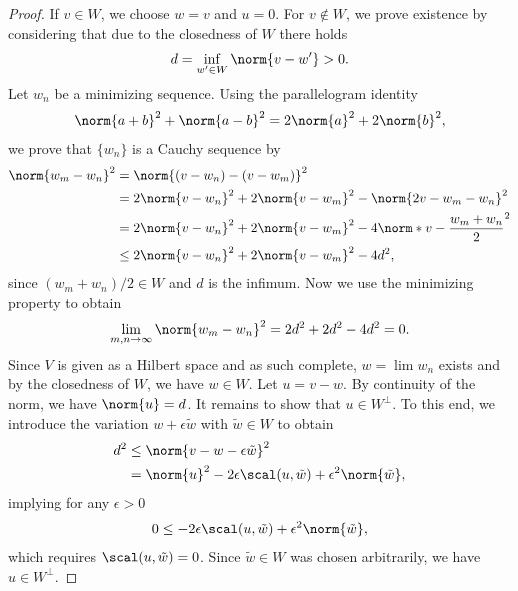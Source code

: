 \begin{proof}
  If $v\in W$, we choose $w=v$ and $u=0$. For $v\not\in W$, we prove
  existence by considering that due to the closedness of $W$ there holds
  \begin{gather*}
    d=\inf_{w' \in W} \norm{v-w'} >0.
  \end{gather*}
  Let $w_n$ be a minimizing sequence. Using the parallelogram identity
  \begin{gather*}
    \norm{a+b}^2+\norm{a-b}^2 = 2\norm{a}^2+2\norm{b}^2,
  \end{gather*}
  we prove that $\{w_n\}$ is a Cauchy sequence by
  \begin{align*}
    \norm{w_m-w_n}^2 &= \norm{(v-w_n)-(v-w_m)}^2\\
    &= 2\norm{v-w_n}^2+2\norm{v-w_m}^2-\norm{2v-w_m-w_n}^2\\
    &= 2\norm{v-w_n}^2+2\norm{v-w_m}^2-4\norm*{v-\frac{w_m+w_n}2}^2\\
    &\le 2\norm{v-w_n}^2+2\norm{v-w_m}^2-4d^2,
  \end{align*}
  since $(w_m+w_n)/2\in W$ and $d$ is the infimum. Now we use the
  minimizing property to obtain
  \begin{gather*}
    \lim_{m,n\to\infty}\norm{w_m-w_n}^2 = 2d^2+2d^2 -4d^2=0.
  \end{gather*}
  Since $V$ is given as a Hilbert space and as such complete, $w=\lim w_n$
  exists and by the closedness of $W$, we have $w\in W$. Let $u=v-w$.
  By continuity of the norm, we have $\norm{u}=d$. It remains to show
  that $u\in W^\perp$. To this end, we introduce the variation
  $w+\epsilon \tilde w$ with $\tilde w \in W$ to obtain
  \begin{align*}
    d^2 &\le \norm{v-w-\epsilon \tilde w}^2\\
    &= \norm{u}^2-2\epsilon\scal(u,\tilde w)+\epsilon^2 \norm{\tilde w},
  \end{align*}
  implying for any $\epsilon>0$
  \begin{gather*}
    0\le-2\epsilon\scal(u,\tilde w)+\epsilon^2 \norm{\tilde w},
  \end{gather*}
  which requires $\scal(u,\tilde w) = 0$. Since $\tilde w \in W$ was chosen
  arbitrarily, we have $u \in W^\perp$.
\end{proof}



